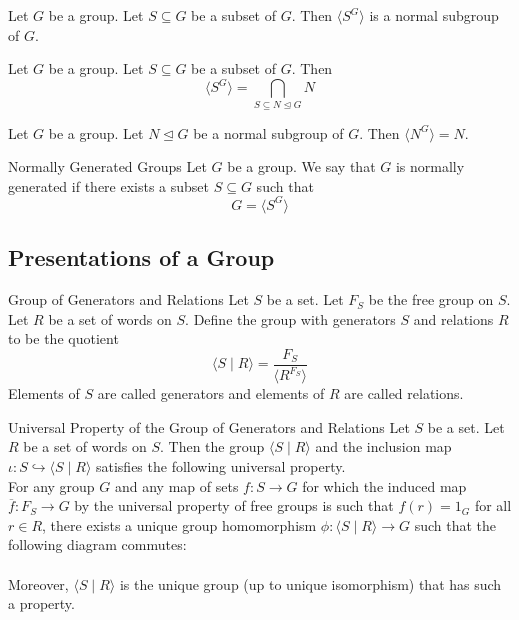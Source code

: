 \documentclass[a4paper]{article}
\begin{document}
\begin{lmm}{}{} Let $G$ be a group. Let $S\subseteq G$ be a subset of $G$. Then $\langle S^G\rangle$ is a normal subgroup of $G$. 
\end{lmm}

\begin{lmm}{}{} Let $G$ be a group. Let $S\subseteq G$ be a subset of $G$. Then $$\langle S^G\rangle=\bigcap_{S\subseteq N\trianglelefteq G}N$$
\end{lmm}

\begin{lmm}{}{} Let $G$ be a group. Let $N\trianglelefteq G$ be a normal subgroup of $G$. Then $\langle N^G\rangle=N$. 
\end{lmm}

\begin{defn}{Normally Generated Groups}{} Let $G$ be a group. We say that $G$ is normally generated if there exists a subset $S\subseteq G$ such that $$G=\langle S^G\rangle$$
\end{defn}

\subsection{Presentations of a Group}
\begin{defn}{Group of Generators and Relations}{} Let $S$ be a set. Let $F_S$ be the free group on $S$. Let $R$ be a set of words on $S$. Define the group with generators $S$ and relations $R$ to be the quotient $$\langle S\;|\;R\rangle=\frac{F_S}{\langle R^{F_S}\rangle}$$ Elements of $S$ are called generators and elements of $R$ are called relations. 
\end{defn}

\begin{prp}{Universal Property of the Group of Generators and Relations}{} Let $S$ be a set. Let $R$ be a set of words on $S$. Then the group $\langle S\;|\;R\rangle$ and the inclusion map $\iota:S\hookrightarrow\langle S\;|\;R\rangle$ satisfies the following universal property. \\

For any group $G$ and any map of sets $f:S\to G$ for which the induced map $\overline{f}:F_S\to G$ by the universal property of free groups is such that $f(r)=1_G$ for all $r\in R$, there exists a unique group homomorphism $\phi:\langle S\;|\;R\rangle\to G$ such that the following diagram commutes: \\
 \\
Moreover, $\langle S\;|\;R\rangle$ is the unique group (up to unique isomorphism) that has such a property. 
\end{prp}
\end{document}
